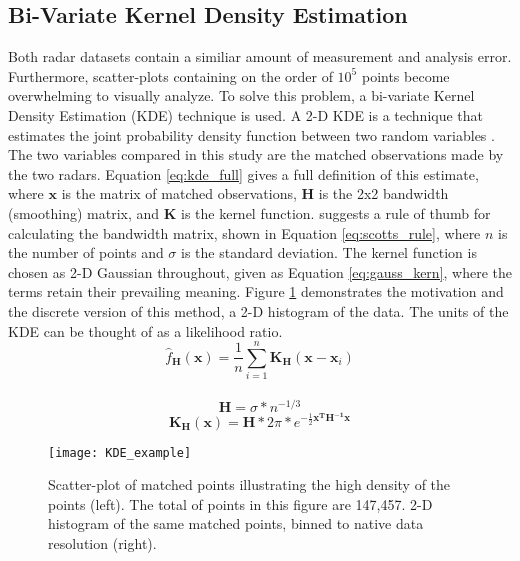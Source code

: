 \subsection{Bi-Variate Kernel Density Estimation}
Both radar datasets contain a similiar amount of measurement and analysis error. Furthermore, scatter-plots containing on the order of $10^5$ points become
overwhelming to visually analyze. To solve this problem, a bi-variate Kernel Density Estimation (KDE) technique is used. A 2-D KDE is a technique that
estimates the joint probability density function between two random variables \citep{Silverman1986}. The two variables compared in this study are the matched
observations made by the two radars. Equation \ref{eq:kde_full} gives a full definition of this estimate, where $\mathbf{x}$ is the matrix of matched
observations, $\mathbf{H}$ is the 2x2 bandwidth (smoothing) matrix, and $\mathbf{K}$ is the kernel function. \citet{Scott1992} suggests a rule of thumb for
calculating the bandwidth matrix, shown in Equation \ref{eq:scotts_rule}, where $n$ is the number of points and $\sigma$ is the standard deviation. The
kernel function is chosen as 2-D Gaussian throughout, given as Equation \ref{eq:gauss_kern}, where the terms retain their prevailing meaning. Figure
\ref{fig:KDE_example} demonstrates the motivation and the discrete version of this method, a 2-D histogram of the data. The units of the KDE can be thought
of as a likelihood ratio.
\begin{equation}\label{eq:kde_full}
\hat{f}_{\mathbf{H}}(\mathbf{x}) = \frac{1}{n} \sum_{i=1}^{n} \mathbf{K_H}(\mathbf{x} - \mathbf{x}_i)
\end{equation}
\\
\begin{equation}\label{eq:scotts_rule}
\mathbf{H} = \sigma * n^{-1/3}
\end{equation}
\begin{equation}\label{eq:gauss_kern}
\mathbf{K_H}(\textbf{x}) = \mathbf{H} * 2\pi * e^{-\frac{1}{2} \mathbf{x^T} \mathbf{H^{-1}} \mathbf{x}}
\end{equation}
\begin{figure}
\texttt{[image: KDE\_example]}\centering
\caption{Scatter-plot of matched points illustrating the high density of the points (left). The total of points in this figure are 147,457. 2-D histogram of
the same matched points, binned to native data resolution (right).} 
\label{fig:KDE_example}
\end{figure}

